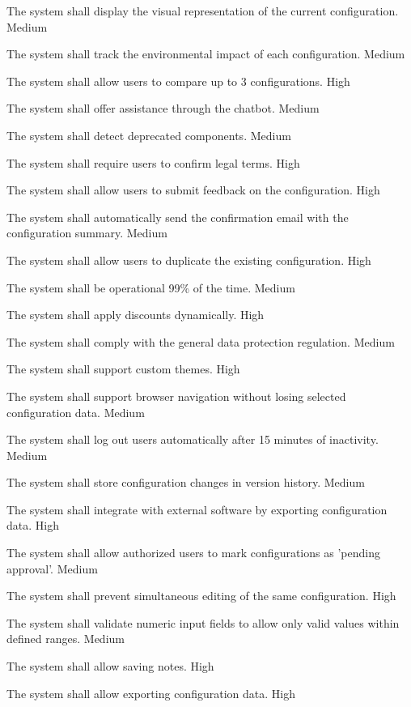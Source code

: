   {
    The system shall display the visual representation of the current configuration.
  }
  {Medium}

  {
    The system shall track the environmental impact of each configuration.
  }
  {Medium}

  {
    The system shall allow users to compare up to 3 configurations.
  }
  {High}

  {
    The system shall offer assistance through the chatbot.
  }
  {Medium}

  {
    The system shall detect deprecated components.
  }
  {Medium}

  {
    The system shall require users to confirm legal terms.
  }
  {High}

  {
    The system shall allow users to submit feedback on the configuration.
  }
  {High}

  {
    The system shall automatically send the confirmation email with the configuration summary.
  }
  {Medium}

  {
    The system shall allow users to duplicate the existing configuration.
  }
  {High}

  {
    The system shall be operational 99\% of the time.
  }
  {Medium}

  {
    The system shall apply discounts dynamically.
  }
  {High}

  {
    The system shall comply with the general data protection regulation.
  }
  {Medium}

  {
    The system shall support custom themes.
  }
  {High}

  {
    The system shall support browser navigation without losing selected configuration data.
  }
  {Medium}

  {
    The system shall log out users automatically after 15 minutes of inactivity.
  }
  {Medium}

  {
    The system shall store configuration changes in version history.
  }
  {Medium}

  {
    The system shall integrate with external software by exporting configuration data.
  }
  {High}

  {
    The system shall allow authorized users to mark configurations as 'pending approval'.
  }
  {Medium}

  {
    The system shall prevent simultaneous editing of the same configuration.
  }
  {High}

  {
    The system shall validate numeric input fields to allow only valid values within defined ranges.
  }
  {Medium}

  {
    The system shall allow saving notes.
  }
  {High}

  {
    The system shall allow exporting configuration data.
  }
  {High}
